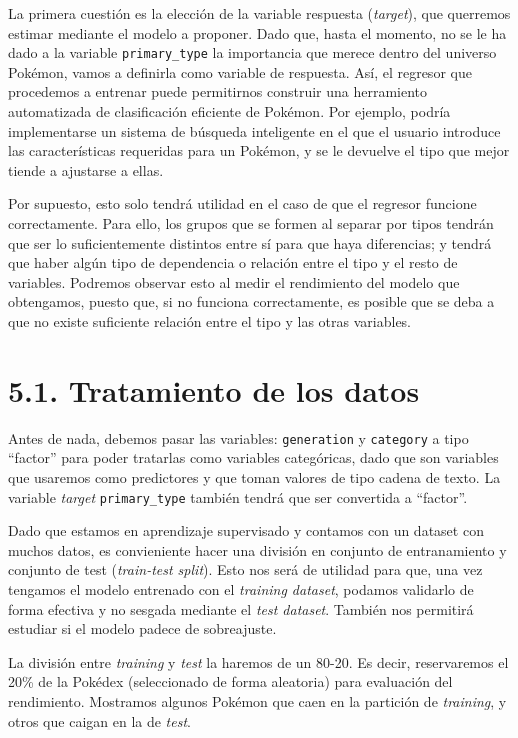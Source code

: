 \documentclass[
  12pt,
]{extreport}
\begin{document}
La primera cuestión es la elección de la variable respuesta
(\emph{target}), que querremos estimar mediante el modelo a proponer.
Dado que, hasta el momento, no se le ha dado a la variable
\texttt{primary\_type} la importancia que merece dentro del universo
Pokémon, vamos a definirla como variable de respuesta. Así, el regresor
que procedemos a entrenar puede permitirnos construir una herramiento
automatizada de clasificación eficiente de Pokémon. Por ejemplo, podría
implementarse un sistema de búsqueda inteligente en el que el usuario
introduce las características requeridas para un Pokémon, y se le
devuelve el tipo que mejor tiende a ajustarse a ellas.

Por supuesto, esto solo tendrá utilidad en el caso de que el regresor
funcione correctamente. Para ello, los grupos que se formen al separar
por tipos tendrán que ser lo suficientemente distintos entre sí para que
haya diferencias; y tendrá que haber algún tipo de dependencia o
relación entre el tipo y el resto de variables. Podremos observar esto
al medir el rendimiento del modelo que obtengamos, puesto que, si no
funciona correctamente, es posible que se deba a que no existe
suficiente relación entre el tipo y las otras variables.

\section{5.1. Tratamiento de los datos}\label{tratamiento-de-los-datos}

Antes de nada, debemos pasar las variables: \texttt{generation} y
\texttt{category} a tipo ``factor'' para poder tratarlas como variables
categóricas, dado que son variables que usaremos como predictores y que
toman valores de tipo cadena de texto. La variable \emph{target}
\texttt{primary\_type} también tendrá que ser convertida a ``factor''.

Dado que estamos en aprendizaje supervisado y contamos con un dataset
con muchos datos, es convieniente hacer una división en conjunto de
entranamiento y conjunto de test (\emph{train-test split}). Esto nos
será de utilidad para que, una vez tengamos el modelo entrenado con el
\emph{training dataset}, podamos validarlo de forma efectiva y no
sesgada mediante el \emph{test dataset}. También nos permitirá estudiar
si el modelo padece de sobreajuste.

La división entre \emph{training} y \emph{test} la haremos de un 80-20.
Es decir, reservaremos el 20\% de la Pokédex (seleccionado de forma
aleatoria) para evaluación del rendimiento. Mostramos algunos Pokémon
que caen en la partición de \emph{training}, y otros que caigan en la de
\emph{test}.
\end{document}
